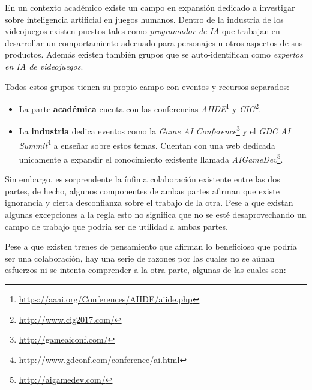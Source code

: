 
En un contexto académico existe un campo en expansión dedicado a investigar sobre inteligencia artificial en juegos humanos. Dentro de la industria de los videojuegos existen puestos tales como \textit{programador de IA} que trabajan en desarrollar un comportamiento adecuado para personajes u otros aspectos de sus productos. Además existen también grupos que se auto-identifican como \textit{expertos en IA de videojuegos}.

\bigskip

Todos estos grupos tienen su propio campo con eventos y recursos separados:

\begin{itemize}
	\item La parte \textbf{académica} cuenta con las conferencias \textit{AIIDE}\footnote{\url{https://aaai.org/Conferences/AIIDE/aiide.php}} y \textit{CIG}\footnote{\url{http://www.cig2017.com/}}.
	\item La \textbf{industria} dedica eventos como la \textit{Game AI Conference}\footnote{\url{http://gameaiconf.com/}} y el \textit{GDC AI Summit}\footnote{\url{http://www.gdconf.com/conference/ai.html}} a enseñar sobre estos temas. Cuentan con una web dedicada unicamente a expandir el conocimiento existente llamada \textit{AIGameDev}\footnote{\url{http://aigamedev.com/}}.
\end{itemize}

\bigskip

Sin embargo, es sorprendente la ínfima colaboración existente entre las dos partes, de hecho, algunos componentes de ambas partes afirman que existe ignorancia y cierta desconfianza sobre el trabajo de la otra. Pese a que existan algunas excepciones a la regla esto no significa que no se esté desaprovechando un campo de trabajo que podría ser de utilidad a ambas partes\cite{blog:emerging}.

\bigskip

Pese a que existen trenes de pensamiento que afirman lo beneficioso que podría ser una colaboración\cite{cio}, hay una serie de razones por las cuales no se aúnan esfuerzos ni se intenta comprender a la otra parte, algunas de las cuales son:

